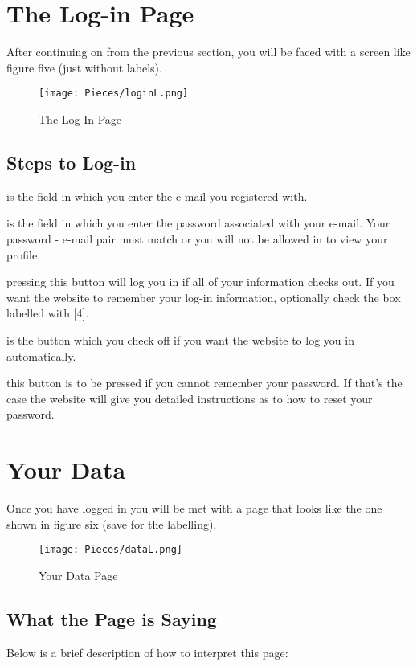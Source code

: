 \section{The Log-in Page}
After continuing on from the previous section, you will be faced with a screen like figure five (just without labels).

\begin{figure}[h]
    \caption{The Log In Page}
    \texttt{[image: Pieces/loginL.png]}
\end{figure}

\subsection{Steps to Log-in}
\begin{enumerate}[{[1]}]
\item is the field in which you enter the e-mail you registered with.
\item is the field in which you enter the password associated with your e-mail. Your password - e-mail pair must match or you will not be allowed in to view your profile.
\item pressing this button will log you in if all of your information checks out. If you want the website to remember your log-in information, optionally check the box labelled with [4].
\item is the button which you check off if you want the website to log you in automatically.
\item this button is to be pressed if you cannot remember your password. If that's the case the website will give you detailed instructions as to how to reset your password.
\end{enumerate}

\section{Your Data}
Once you have logged in you will be met with a page that looks like the one shown in figure six (save for the labelling).

\begin{figure}[h]
    \caption{Your Data Page}
    \texttt{[image: Pieces/dataL.png]}
\end{figure}

\subsection{What the Page is Saying}
Below is a brief description of how to interpret this page:

